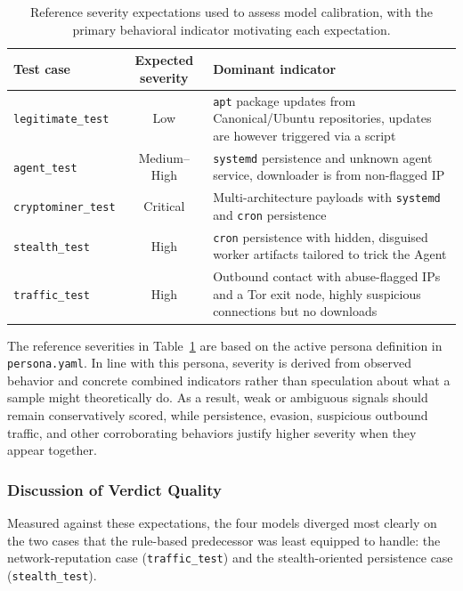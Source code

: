 \begin{table}[h]
\centering
\footnotesize
\renewcommand{\arraystretch}{1.25}
\begin{tabular}{lcp{8cm}}
\hline
\textbf{Test case} & \textbf{Expected severity} & \textbf{Dominant indicator} \\
\hline
\texttt{legitimate\_test}  & Low      & \texttt{apt} package updates from Canonical/Ubuntu repositories, updates are however triggered via a script \\
\texttt{agent\_test}       & Medium--High & \texttt{systemd} persistence and unknown agent service, downloader is from non-flagged IP \\
\texttt{cryptominer\_test} & Critical & Multi-architecture payloads with \texttt{systemd} and \texttt{cron} persistence \\
\texttt{stealth\_test}     & High     & \texttt{cron} persistence with hidden, disguised worker artifacts tailored to trick the Agent \\
\texttt{traffic\_test}     & High     & Outbound contact with abuse-flagged IPs and a Tor exit node, highly suspicious connections but no downloads \\
\hline
\end{tabular}
\caption{Reference severity expectations used to assess model calibration, with the
primary behavioral indicator motivating each expectation.}
\label{tab:reference-severity}
\end{table}

\noindent
The reference severities in Table~\ref{tab:reference-severity} are based on the active persona definition in \texttt{persona.yaml}. In line with this persona, severity is derived from observed behavior and concrete combined indicators rather than speculation about what a sample might theoretically do. As a result, weak or ambiguous signals should remain conservatively scored, while persistence, evasion, suspicious outbound traffic, and other corroborating behaviors justify higher severity when they appear together.

\subsubsection{Discussion of Verdict Quality}
\noindent
Measured against these expectations, the four models diverged most clearly on the
two cases that the rule-based predecessor was least equipped to handle: the
network-reputation case (\texttt{traffic\_test}) and the stealth-oriented
persistence case (\texttt{stealth\_test}).

